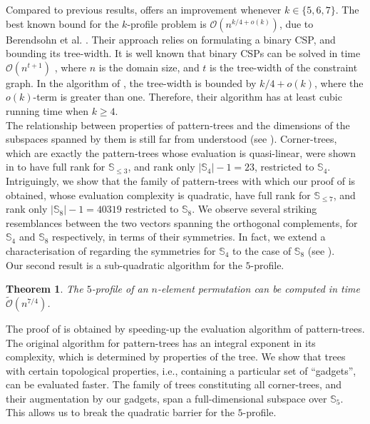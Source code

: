 \documentclass{article}
\theoremstyle{remark}
\newcommand{\Otilde}[1]{\widetilde{\mathcal{O}}\left( #1 \right)}
\theoremstyle{plain}
\newtheorem{introthm}{Theorem}
\begin{document}
Compared to previous results,  offers an improvement whenever $k \in \{5,6,7\}$. 
The best known bound for the $k$-profile problem is $\mathcal{O}(n^{k/4 + o(k)})$, due to Berendsohn et al. \cite{berendsohn2021finding}.
Their approach relies on formulating a binary CSP, and bounding its tree-width.
It is well known that binary CSPs can be solved in time $\mathcal{O}(n^{t+1})$ \cite{dechter1989tree, freuderl1990complexity},
where $n$ is the domain size, and $t$ is the tree-width of the constraint graph.
In the algorithm of \cite{berendsohn2021finding}, the tree-width is bounded by $k/4 + o(k)$,
where the $o(k)$-term is greater than one.
Therefore, their algorithm has at least cubic running time when $k \ge 4$. \ \\

The relationship between properties of pattern-trees and the dimensions of the subspaces spanned by them is still far from understood (see ).
Corner-trees,
which are exactly the pattern-trees whose evaluation is quasi-linear,
were shown in \cite{even2021counting} to have full rank for $\mathbb{S}_{\le 3}$,
and rank only $|\mathbb{S}_4|-1 = 23$, restricted to $\mathbb{S}_4$. 
Intriguingly, we show that the family of pattern-trees with which our proof of  is obtained,
whose evaluation complexity is quadratic, have full rank for $\mathbb{S}_{\le 7}$,
and rank only $|\mathbb{S}_8|-1 = 40319$ restricted to $\mathbb{S}_8$.
We observe several striking resemblances between the two vectors spanning the orthogonal complements,
for $\mathbb{S}_4$ and $\mathbb{S}_8$ respectively, in terms of their symmetries.
In fact, we extend a characterisation of \cite{dudek2020counting} regarding the symmetries for $\mathbb{S}_4$
to the case of $\mathbb{S}_8$ (see ). \ \\

Our second result is a sub-quadratic algorithm for the $5$-profile.
\begin{introthm}
    \label{introthm:fast-5-prof}
    The $5$-profile of an $n$-element permutation can be computed in time $\Otilde{n^{7/4}}$.
\end{introthm}

The proof of  is obtained by speeding-up the evaluation algorithm of pattern-trees.
The original algorithm for pattern-trees 
has an integral exponent in its complexity, which is determined by properties of the tree.
We show that trees with certain topological properties, i.e., containing a particular set of ``gadgets'', can be evaluated faster.
The family of trees constituting all corner-trees, and their augmentation by our gadgets,
span a full-dimensional subspace over $\mathbb{S}_5$.
This allows us to break the quadratic barrier for the $5$-profile.
\end{document}
